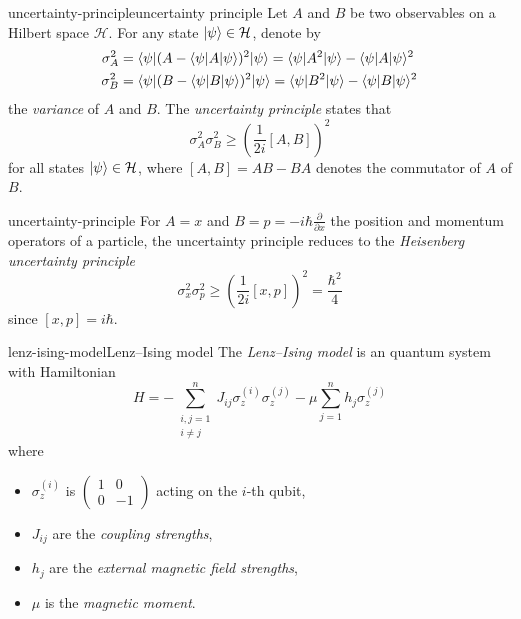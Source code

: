 \begin{topic}{uncertainty-principle}{uncertainty principle}
    Let $A$ and $B$ be two observables on a Hilbert space $\mathcal{H}$. For any state $|\psi\rangle \in \mathcal{H}$, denote by
    \[ \begin{aligned}
        \sigma_A^2 &= \langle\psi| (A - \langle\psi| A |\psi\rangle)^2 |\psi\rangle = \langle\psi| A^2 |\psi\rangle - \langle\psi| A |\psi\rangle^2 \\
        \sigma_B^2 &= \langle\psi| (B - \langle\psi| B |\psi\rangle)^2 |\psi\rangle = \langle\psi| B^2 |\psi\rangle - \langle\psi| B |\psi\rangle^2
    \end{aligned} \]
    the \textit{variance} of $A$ and $B$. The \emph{uncertainty principle} states that
    \[ \sigma_A^2 \sigma_B^2 \ge \left(\frac{1}{2 i} [A, B] \right)^2 \]
    for all states $|\psi\rangle \in \mathcal{H}$, where $[A, B] = AB - BA$ denotes the commutator of $A$ of $B$.
\end{topic}

\begin{example}{uncertainty-principle}
    For $A = x$ and $B = p = - i \hbar \tfrac{\partial}{\partial x}$ the position and momentum operators of a particle, the uncertainty principle reduces to the \textit{Heisenberg uncertainty principle}
    \[ \sigma_x^2 \sigma_p^2 \ge \left(\frac{1}{2 i} [x, p] \right)^2 = \frac{\hbar^2}{4} \]
    since $[x, p] = i \hbar$.
\end{example}

\begin{topic}{lenz-ising-model}{Lenz--Ising model}
    The \emph{Lenz--Ising model} is an  quantum system with Hamiltonian
    \[ H = - \sum_{\substack{i, j = 1 \\ i \ne j}}^{n} J_{ij} \sigma_z^{(i)} \sigma_z^{(j)} - \mu \sum_{j = 1}^{n} h_j \sigma_z^{(j)} \]
    where
    \begin{itemize}
        \item $\sigma_z^{(i)}$ is $\left(\begin{smallmatrix} 1 & 0 \\ 0 & -1 \end{smallmatrix}\right)$ acting on the $i$-th qubit,
        \item $J_{ij}$ are the \textit{coupling strengths},
        \item $h_j$ are the \textit{external magnetic field strengths},
        \item $\mu$ is the \textit{magnetic moment}.
    \end{itemize}
\end{topic}

